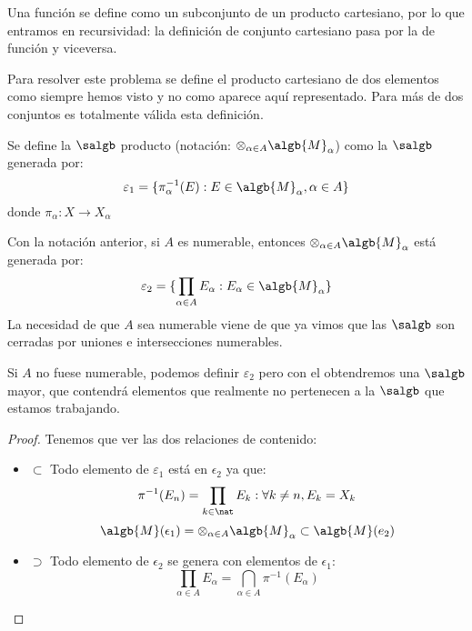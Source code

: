 \documentclass{apuntes}
\begin{document}
Una función se define como un subconjunto de un producto cartesiano, por lo que entramos en recursividad: la definición de conjunto cartesiano pasa por la de función y viceversa.

 Para resolver este problema se define el producto cartesiano de dos elementos como siempre hemos visto y no como aparece aquí representado. Para más de dos conjuntos es totalmente válida esta definición.


\begin{defn}
Se define la $\salgb$ producto (notación:  $\otimes_{\alpha\in A}\algb{M}_\alpha$) como la $\salgb$ generada por:
\[\varepsilon_1 = \{\pi_\alpha^{-1}(E):E \in \algb{M}_\alpha, \alpha\in A\}\]
donde $\pi_\alpha: X \rightarrow X_\alpha$
\end{defn}

\begin{prop}
Con la notación anterior, si $A$ es numerable, entonces $\otimes_{\alpha\in A}\algb{M}_\alpha$ está generada por:
\[\varepsilon_2 = \{\prod_{\alpha\in A}E_\alpha:E_\alpha \in \algb{M}_\alpha\}\]
La necesidad de que $A$ sea numerable viene de que ya vimos que las $\salgb$ son cerradas por uniones e intersecciones numerables.

Si $A$ no fuese numerable, podemos definir $\varepsilon_2$ pero con el obtendremos una $\salgb$ mayor, que contendrá elementos que realmente no pertenecen a la $\salgb$ que estamos trabajando.
\end{prop}
\begin{proof}
Tenemos que ver las dos relaciones de contenido:
\begin{itemize}
\item $\subset$
Todo elemento de $\varepsilon_1$ está en $\epsilon_2$ ya que:
\[\pi^{-1}(E_n)=\prod_{k \in \nat}E_k : \forall k\neq n, E_k=X_k\]
\[\algb{M}(\epsilon_1)=\otimes_{\alpha \in A}\algb{M}_\alpha \subset \algb{M}(e_2)\]
\item $\supset$
Todo elemento de $\epsilon_2$ se genera con elementos de $\epsilon_1$:
\[\prod_{\alpha\in A}E_\alpha = \bigcap_{\alpha\in A} \pi^{-1}(E_\alpha)\]
\end{itemize}
\end{proof}
\end{document}
